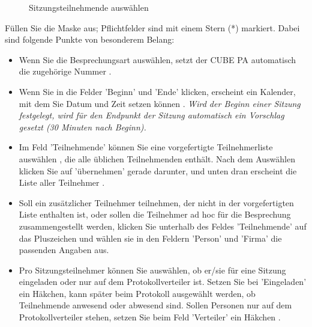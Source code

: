 \begin{figure}[H]
\caption{Sitzungsteilnehmende auswählen}
\end{figure}

Füllen Sie die Maske aus; Pflichtfelder sind mit einem Stern (*) markiert. Dabei sind folgende Punkte von besonderem Belang:

\begin{itemize}
\item 
Wenn Sie die Besprechungsart auswählen, setzt der CUBE PA automatisch die zugehörige Nummer .
\item 
Wenn Sie in die Felder 'Beginn' und 'Ende' klicken, erscheint ein Kalender, mit dem Sie Datum und Zeit setzen können . \textit{Wird der Beginn einer Sitzung festgelegt, wird für den Endpunkt der Sitzung automatisch ein Vorschlag gesetzt (30 Minuten nach Beginn).}
\item 
Im Feld 'Teilnehmende' können Sie eine vorgefertigte Teilnehmerliste auswählen , die alle üblichen Teilnehmenden enthält. Nach dem Auswählen klicken Sie auf 'übernehmen'  gerade darunter, und unten dran erscheint die Liste aller Teilnehmer .
\item 
Soll ein zusätzlicher Teilnehmer teilnehmen, der nicht in der vorgefertigten Liste enthalten ist, oder sollen die Teilnehmer ad hoc für die Besprechung zusammengestellt werden, klicken Sie unterhalb des Feldes 'Teilnehmende' auf das Pluszeichen  und wählen sie in den Feldern 'Person' und 'Firma' die passenden Angaben aus. 
\item
Pro Sitzungsteilnehmer können Sie auswählen, ob er/sie für eine Sitzung eingeladen oder nur auf dem Protokollverteiler ist. Setzen Sie bei 'Eingeladen'  ein Häkchen, kann später beim Protokoll ausgewählt werden, ob Teilnehmende anwesend oder abwesend sind. Sollen Personen nur auf dem Protokollverteiler stehen, setzen Sie beim Feld 'Verteiler' ein Häkchen .

\vspace{\baselineskip}


\end{itemize}
